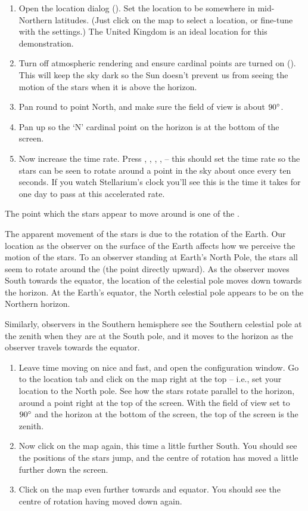 \begin{enumerate}
\item Open the location dialog (). Set the location to be
  somewhere in mid-Northern latitudes. (Just click on the map to
  select a location, or fine-tune with the settings.) The United
  Kingdom is an ideal location for this demonstration.
\item Turn off atmospheric rendering  and ensure cardinal points are
  turned on (). This will keep the sky dark so the Sun doesn't prevent us
  from seeing the motion of the stars when it is above the horizon.
\item Pan round to point North, and make sure the field of view is
  about $90\degree$.
\item Pan up so the `N' cardinal point on the horizon is at the bottom
  of the screen.
\item Now increase the time rate. Press , , ,
  ,  -- this should set the time rate so the stars can
  be seen to rotate around a point in the sky about once every ten
  seconds. If you watch Stellarium's clock you'll see this is the time
  it takes for one day to pass at this accelerated rate.
\end{enumerate}

The point which the stars appear to move around is one of the
.

The apparent movement of the stars is due to the rotation of the Earth.
Our location as the observer on the surface of the Earth affects how we
perceive the motion of the stars. To an observer standing at Earth's
North Pole, the stars all seem to rotate around the  (the
point directly upward). As the observer moves South towards the equator,
the location of the celestial pole moves down towards the horizon. At
the Earth's equator, the North celestial pole appears to be on the
Northern horizon.

Similarly, observers in the Southern hemisphere see the Southern
celestial pole at the zenith when they are at the South pole, and it
moves to the horizon as the observer travels towards the equator.

\begin{enumerate}
\item
  Leave time moving on nice and fast, and open the configuration window.
  Go to the location tab and click on the map right at the top -- i.e.,
  set your location to the North pole. See how the stars rotate parallel to the horizon, around a
  point right at the top of the screen. With the field of view set to
  $90\degree$ and the horizon at the bottom of the screen, the top of the screen
  is the zenith.
\item
  Now click on the map again, this time a little further South. You
  should see the positions of the stars jump, and the centre of rotation
  has moved a little further down the screen.
\item
  Click on the map even further towards and equator. You should see the
  centre of rotation having moved down again.
\end{enumerate}

